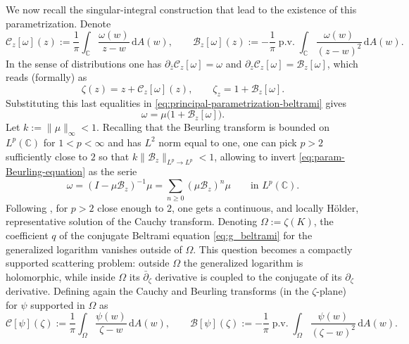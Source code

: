 \documentclass[reqno]{amsart}
\numberwithin{equation}{section}
\theoremstyle{definition}
\theoremstyle{remark}
\newcommand\C{\mathbb{C}}
\providecommand{\dd}{\,\mathrm d}
\providecommand{\pv}{\operatorname{p.v.}}
\begin{document}
We now recall the singular-integral construction that lead to the existence of this parametrization. Denote
\begin{equation}\label{eq:z-plane-Cauchy-Beurling}
        \mathcal C_z[\omega](z):=\frac1\pi\int_\C\frac{\omega(w)}{z-w}\dd A(w),
        \qquad
        \mathcal B_z[\omega](z):=-\frac1\pi\pv\int_\C
        \frac{\omega(w)}{(z-w)^2}\dd A(w).
\end{equation}
In the sense of distributions one has $ \partial_{\bar z}\mathcal C_z[\omega]=\omega$ and $
        \partial_z\mathcal C_z[\omega]=\mathcal B_z[\omega]$, which reads (formally) as
\begin{equation}\label{eq:zeta-param-Cauchy}
        \zeta(z)=z+\mathcal C_z[\omega](z),
        \qquad
        \zeta_z=1+\mathcal B_z[\omega].
\end{equation}
Substituting this last equalities in \eqref{eq:principal-parametrization-beltrami} gives
\begin{equation}\label{eq:param-Beurling-equation}
        \omega=\mu\bigl(1+\mathcal B_z[\omega]\bigr).
\end{equation}
Let $k:=\|\mu\|_\infty<1$.  Recalling that the Beurling transform is bounded on $L^p(\C)$ for $1<p<\infty$ and has $L^2$ norm equal to one, one can pick
$p>2$ sufficiently close to $2$ so that $ k\|\mathcal B_z\|_{L^p\to L^p}<1$, allowing to invert \eqref{eq:param-Beurling-equation} as the serie
\begin{equation}\label{eq:param-Neumann-series}
        \omega=(I-\mu\mathcal B_z)^{-1}\mu
        =
        \sum_{n\geq0}(\mu\mathcal B_z)^n\mu
        \qquad\text{in }L^p(\C).
\end{equation}
Following \cite[Chapters~4--5]{AIM}, for $p>2$ close enough to $2$, one gets a continuous, and locally Hölder, representative solution of the Cauchy transform. Denoting  $\Omega:=\zeta(K)$, the coefficient $q$ of the conjugate Beltrami equation \eqref{eq:g_beltrami} for the generalized logarithm vanishes outside of $\Omega$. This question becomes a compactly supported scattering problem: outside $\Omega$ the generalized logarithm is holomorphic, while inside $\Omega$ its $\bar\partial_\zeta$
derivative is coupled to the conjugate of its $\partial_\zeta$ derivative. Defining again the Cauchy and Beurling transforms (in the $\zeta$-plane)  for $\psi$ supported in $\Omega$ as
\begin{equation}\label{eq:Cauchy-Beurling}
        \mathcal C[\psi](\zeta):=\frac1\pi\int_\Omega
        \frac{\psi(w)}{\zeta-w}\dd A(w),
        \qquad
        \mathcal B[\psi](\zeta):=-\frac1\pi\pv\int_\Omega
        \frac{\psi(w)}{(\zeta-w)^2}\dd A(w).
\end{equation}
\end{document}
